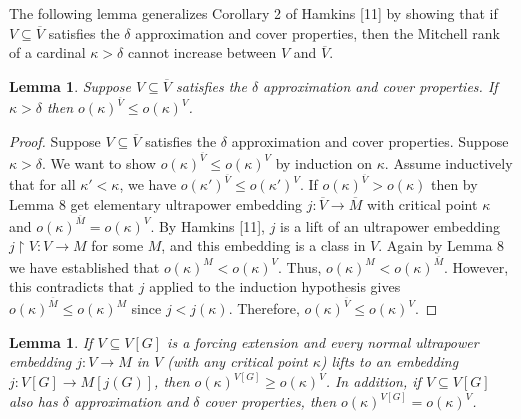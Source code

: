 \documentclass[10pt,leqno]{amsart}
\newtheorem{lemma}[theorem]{Lemma}
\begin{document}
The following lemma generalizes Corollary 2 of Hamkins [11] by showing that if $V \subseteq \overline{V}$ satisfies the $\delta$ approximation and cover properties, then the Mitchell rank of a cardinal $\kappa > \delta$ cannot increase between $V$ and $\overline{V}$.

\begin{lemma} Suppose $V \subseteq \overline{V}$ satisfies the $\delta$ approximation and cover properties. If $\kappa > \delta$ then $o(\kappa)^{\overline{V}} \le o(\kappa)^V$.
\end{lemma}

\begin{proof} Suppose $V \subseteq \overline{V}$ satisfies the $\delta$ approximation and cover properties. Suppose $\kappa > \delta$. We want to show $o(\kappa)^{\overline{V}} \le o(\kappa)^V$ by induction on $\kappa$. Assume inductively that for all $\kappa' < \kappa$, we have $o(\kappa')^{\overline{V}} \le o(\kappa')^V$. If $o(\kappa)^{\overline{V}} > o(\kappa)$ then by Lemma 8 get elementary ultrapower embedding $j:\overline{V} \to \overline{M}$ with critical point $\kappa$ and $o(\kappa)^{\overline{M}} = o(\kappa)^V$. By Hamkins [11], $j$ is a lift of an ultrapower embedding $j \upharpoonright V: V \to M$ for some $M$, and this embedding is a class in $V$. Again by Lemma 8 we have established that $o(\kappa)^M < o(\kappa)^V$. Thus, $o(\kappa)^M < o(\kappa)^{\overline{M}}$. However, this contradicts that $j$ applied to the induction hypothesis gives $o(\kappa)^{\overline{M}} \le o(\kappa)^M$ since $j < j(\kappa)$. Therefore, $o(\kappa)^{\overline{V}} \le o(\kappa)^V.$
\end{proof}

\begin{lemma} If $V \subseteq V[G]$ is a forcing extension and every normal ultrapower embedding $j:V \to M$ in $V$ (with any critical point $\kappa$) lifts to an embedding $j:V[G] \to M[j(G)]$, then $o(\kappa)^{V[G]} \ge o(\kappa)^V$. In addition, if $V \subseteq V[G]$ also has $\delta$ approximation and $\delta$ cover properties, then $o(\kappa)^{V[G]} = o(\kappa)^V$.
\end{lemma}
\end{document}
